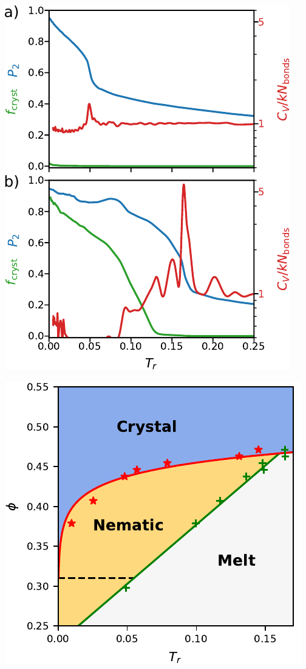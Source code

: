 \documentclass[aspectratio=169]{beamer}
\begin{document}
\begin{frame}[c]{}

  \centering
  \includegraphics[height=\textheight]{../figures/ch5_soft_from_diss/figs-hard_harm/fig-WLMC_side_phi/fig-WLMC.pdf}

\end{frame}

\begin{frame}[c]{}

  \centering
  \includegraphics[height=\textheight]{../figures/ch5_soft_from_diss/figs-hard_harm/fig-phase_diag/fig-phase_diag.pdf}

\end{frame}
\end{document}
